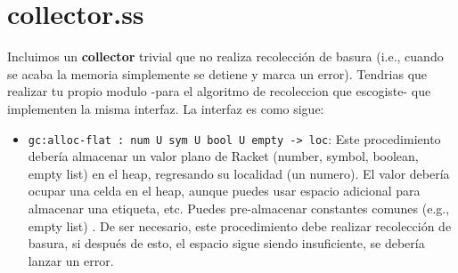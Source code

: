 \documentclass{article}
\begin{document}
\section*{collector.ss}
Incluimos un \textbf{collector} trivial que no realiza recolección de basura (i.e., cuando se acaba la memoria
simplemente se detiene y marca un error). Tendrias que realizar tu propio modulo -para el algoritmo de recoleccion
que escogiste- que implementen la misma interfaz. La interfaz es como sigue:

\begin{itemize}
\item \verb;gc:alloc-flat : num U sym U bool U empty -> loc;: Este procedimiento debería almacenar un valor
  plano de Racket (number, symbol, boolean, empty list) en el heap, regresando su localidad (un numero). El valor
  debería ocupar una celda en el heap, aunque puedes usar espacio adicional para almacenar una etiqueta, etc.
  Puedes pre-almacenar constantes comunes (e.g., empty list) . De ser necesario, este procedimiento debe
  realizar recolección de basura, si después de esto, el espacio sigue siendo insuficiente, se debería lanzar
  un error.
\end{itemize}
\end{document}
